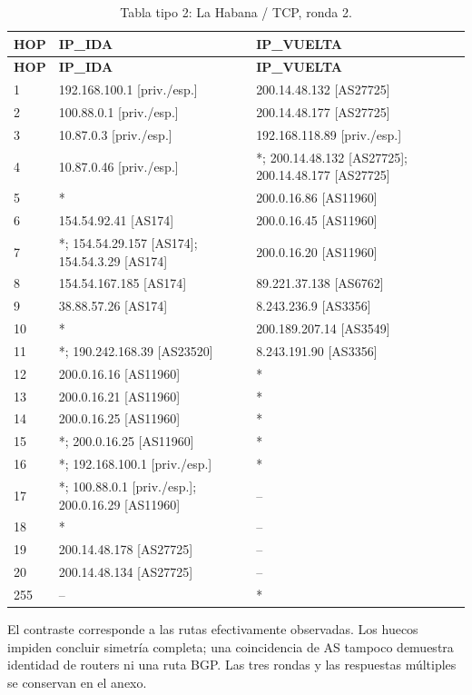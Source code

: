 \begin{longtable}{p{0.95cm}p{7.075cm}p{7.075cm}}
\caption{Tabla tipo 2: La Habana / TCP, ronda 2.}\label{tabla2:200.14.48.134:TCP} \\
\toprule
\textbf{HOP} & \textbf{IP\_\allowbreak{}IDA} & \textbf{IP\_\allowbreak{}VUELTA} \\ \midrule
\endfirsthead
\toprule
\textbf{HOP} & \textbf{IP\_\allowbreak{}IDA} & \textbf{IP\_\allowbreak{}VUELTA} \\ \midrule
\endhead
1 & 192.168.100.1 [priv./esp.] & 200.14.48.132 [AS27725] \\
2 & 100.88.0.1 [priv./esp.] & 200.14.48.177 [AS27725] \\
3 & 10.87.0.3 [priv./esp.] & 192.168.118.89 [priv./esp.] \\
4 & 10.87.0.46 [priv./esp.] & *; 200.14.48.132 [AS27725]; 200.14.48.177 [AS27725] \\
5 & * & 200.0.16.86 [AS11960] \\
6 & 154.54.92.41 [AS174] & 200.0.16.45 [AS11960] \\
7 & *; 154.54.29.157 [AS174]; 154.54.3.29 [AS174] & 200.0.16.20 [AS11960] \\
8 & 154.54.167.185 [AS174] & 89.221.37.138 [AS6762] \\
9 & 38.88.57.26 [AS174] & 8.243.236.9 [AS3356] \\
10 & * & 200.189.207.14 [AS3549] \\
11 & *; 190.242.168.39 [AS23520] & 8.243.191.90 [AS3356] \\
12 & 200.0.16.16 [AS11960] & * \\
13 & 200.0.16.21 [AS11960] & * \\
14 & 200.0.16.25 [AS11960] & * \\
15 & *; 200.0.16.25 [AS11960] & * \\
16 & *; 192.168.100.1 [priv./esp.] & * \\
17 & *; 100.88.0.1 [priv./esp.]; 200.0.16.29 [AS11960] & -- \\
18 & * & -- \\
19 & 200.14.48.178 [AS27725] & -- \\
20 & 200.14.48.134 [AS27725] & -- \\
255 & -- & * \\
\bottomrule
\end{longtable}
\endgroup
El contraste corresponde a las rutas efectivamente observadas. Los huecos impiden concluir simetría completa; una coincidencia de AS tampoco demuestra identidad de routers ni una ruta BGP. Las tres rondas y las respuestas múltiples se conservan en el anexo.

